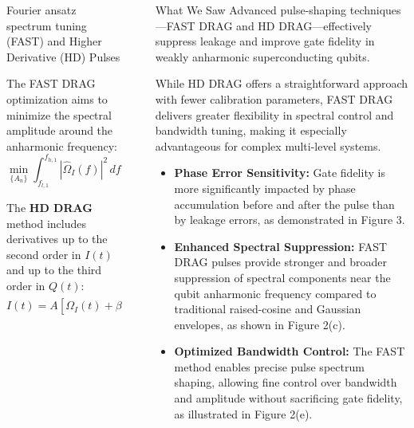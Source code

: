 \documentclass[final]{beamer}
\newlength{\sepwidth}
\newlength{\colwidth}
\newcommand{\separatorcolumn}{\begin{column}{\sepwidth}\end{column}}
\begin{document}
\begin{frame}[t]
\begin{columns}[t]
\begin{column}{\colwidth}
\begin{exampleblock}{Fourier ansatz spectrum tuning (FAST) and Higher Derivative (HD) Pulses}

                The FAST DRAG optimization aims to minimize the spectral amplitude around the anharmonic frequency:
                \[
                \min_{\{A_n\}} \int_{f_{l,1}}^{f_{h,1}} \left| \hat{\Omega}_I(f) \right|^{2} \, df,
                \]


                The \textbf{HD DRAG} method includes derivatives up to the second order in \(I(t)\) and up to the third order in \(Q(t)\):
                \[
                I(t) = A \left[ \Omega_I(t) + \beta_2 \ddot{\Omega}_I(t) \right], \quad
                Q(t) = -\frac{A \beta}{\alpha} \left[ \dot{\Omega}_I(t) + \beta_2 \dddot{\Omega}_I(t) \right].
                \]
            \end{exampleblock}

        \end{column}

        \separatorcolumn
        \begin{column}{\colwidth}

            \begin{alertblock}{What We Saw}
                Advanced pulse-shaping techniques—FAST DRAG and HD DRAG—effectively suppress leakage and improve gate fidelity in weakly anharmonic superconducting qubits.

                While HD DRAG offers a straightforward approach with fewer calibration parameters, FAST DRAG delivers greater flexibility in spectral control and bandwidth tuning, making it especially advantageous for complex multi-level systems.

                \begin{itemize}
                    \item \textbf{Phase Error Sensitivity:} Gate fidelity is more significantly impacted by phase accumulation before and after the pulse than by leakage errors, as demonstrated in Figure 3.
                    \item \textbf{Enhanced Spectral Suppression:} FAST DRAG pulses provide stronger and broader suppression of spectral components near the qubit anharmonic frequency compared to traditional raised-cosine and Gaussian envelopes, as shown in Figure 2(c).
                    \item \textbf{Optimized Bandwidth Control:} The FAST method enables precise pulse spectrum shaping, allowing fine control over bandwidth and amplitude without sacrificing gate fidelity, as illustrated in Figure 2(e).
                \end{itemize}


\end{alertblock}
\end{column}
\end{columns}
\end{frame}
\end{document}
